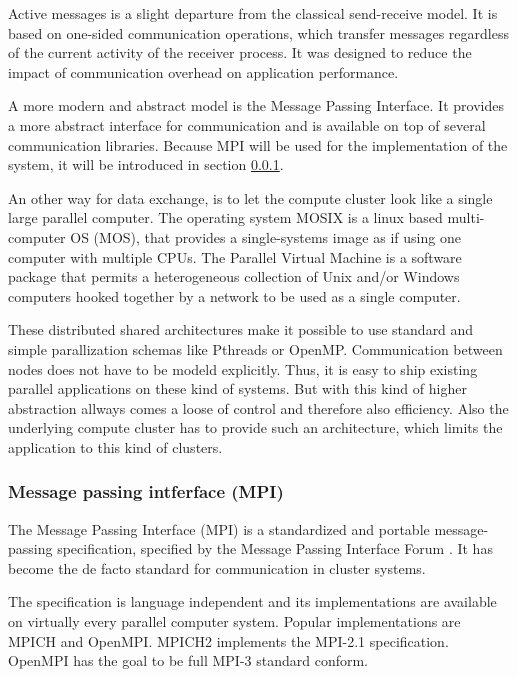 Active messages \cite{ref:am} is a slight departure from the classical
send-receive model. It is based on one-sided communication operations,
which transfer messages regardless of the current activity of the
receiver process. It was designed to reduce the impact of
communication overhead on application performance.

A more modern and abstract model is the Message Passing Interface. It
provides a more abstract interface for communication and is available
on top of several communication libraries. Because MPI will be used
for the implementation of the system, it will be introduced
in section \ref{sec:mpi}.

An other way for data exchange, is to let the compute cluster look
like a single large parallel computer. The operating system MOSIX
\cite{ref:mosix} is a linux based multi-computer OS (MOS), that
provides a single-systems image\cite{ref:single_system_image} as if
using one computer with multiple CPUs. The Parallel Virtual
Machine\cite{ref:pvm} is a software package that permits a
heterogeneous collection of Unix and/or Windows computers hooked
together by a network to be used as a single computer.

These distributed shared architectures make it possible to use
standard and simple parallization schemas like Pthreads or OpenMP.
Communication between nodes does not have to be modeld explicitly.
Thus, it is easy to ship existing parallel applications on these kind
of systems. But with this kind of higher abstraction allways comes a
loose of control and therefore also efficiency. Also the underlying
compute cluster has to provide such an architecture, which limits the
application to this kind of clusters.

\subsubsection{Message passing intferface (MPI)}
\label{sec:mpi}
The Message Passing Interface (MPI) is a standardized and portable
message-passing specification, specified by the Message Passing
Interface Forum \cite{ref:mpi_specification}. It has become the de
facto standard for communication in cluster systems.

The specification is language independent and its implementations are
available on virtually every parallel computer system.  Popular
implementations are MPICH and OpenMPI. MPICH2 implements the MPI-2.1
specification. OpenMPI has the goal to be full MPI-3 standard conform.

